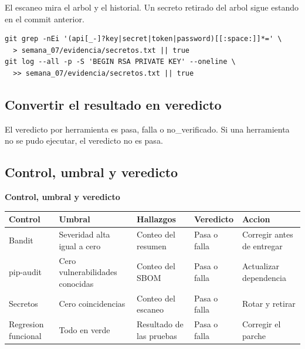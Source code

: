 \documentclass[11pt,a4paper]{article}
\begin{document}
El escaneo mira el arbol y el historial. Un secreto retirado del arbol sigue estando en el commit anterior.

\begin{lstlisting}[style=estiloCodigo]
git grep -nEi '(api[_-]?key|secret|token|password)[[:space:]]*=' \
  > semana_07/evidencia/secretos.txt || true
git log --all -p -S 'BEGIN RSA PRIVATE KEY' --oneline \
  >> semana_07/evidencia/secretos.txt || true
\end{lstlisting}

\subsection{Convertir el resultado en veredicto}

El veredicto por herramienta es pasa, falla o no\_verificado. Si una herramienta no se pudo ejecutar, el veredicto no es pasa.

\needspace{8\baselineskip}\subsection{Control, umbral y veredicto}

\begin{center}
\begin{minipage}{\linewidth}
\centering
{\footnotesize
\textbf{Control, umbral y veredicto}\par\smallskip
\begin{tabular}{@{}>{\raggedright\arraybackslash}p{2.40cm}>{\raggedright\arraybackslash}p{2.60cm}>{\raggedright\arraybackslash}p{4.00cm}>{\raggedright\arraybackslash}p{2.20cm}>{\raggedright\arraybackslash}p{2.60cm}@{}}
\toprule
\textbf{Control} & \textbf{Umbral} & \textbf{Hallazgos} & \textbf{Veredicto} & \textbf{Accion} \\
\midrule
Bandit & Severidad alta igual a cero & Conteo del resumen & Pasa o falla & Corregir antes de entregar \\
pip-audit & Cero vulnerabilidades conocidas & Conteo del SBOM & Pasa o falla & Actualizar dependencia \\
Secretos & Cero coincidencias & Conteo del escaneo & Pasa o falla & Rotar y retirar \\
Regresion funcional & Todo en verde & Resultado de las pruebas & Pasa o falla & Corregir el parche \\
\bottomrule
\end{tabular}
}
\par{}
\end{minipage}
\end{center}
\end{document}
